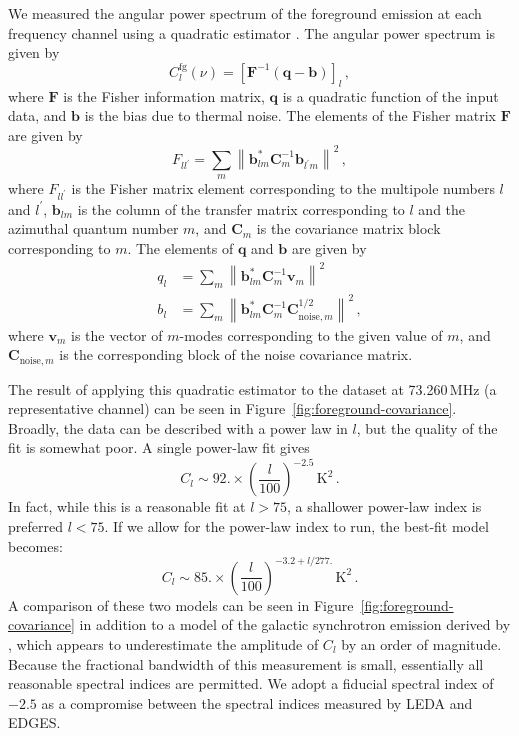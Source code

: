 \documentclass[twocolumn]{aastex62}
\newcommand{\todo}[1]{\PackageWarning{TODO:}{#1!}}
\renewcommand{\b}{\pmb}
\begin{document}
We measured the angular power spectrum of the foreground emission at each frequency channel using a
quadratic estimator \citep{1997PhRvD..55.5895T}. The angular power spectrum is given by
\begin{equation}
    C_l^\text{fg}(\nu) = \left[\b F^{-1} (\b q - \b b)\right]_l\,,
\end{equation}
where $\b F$ is the Fisher information matrix, $\b q$ is a quadratic function of the input data, and
$\b b$ is the bias due to thermal noise.  The elements of the Fisher matrix $\b F$ are given by
\begin{equation}
    F_{ll^\prime} = \sum_m \left\| \b b_{lm}^*\b C_m^{-1} \b b_{l^\prime m} \right\|^2\,,
\end{equation}
where $F_{ll^\prime}$ is the Fisher matrix element corresponding to the multipole numbers $l$ and
$l^\prime$, $\b b_{lm}$ is the column of the transfer matrix corresponding to $l$ and the azimuthal
quantum number $m$, and $\b C_m$ is the covariance matrix block corresponding to $m$. The elements
of $\b q$ and $\b b$ are given by
\begin{align}
    q_l &= \sum_m \left\| \b b_{lm}^*\b C_m^{-1} \b v_m \right\|^2 \\
    b_l &= \sum_m \left\| \b b_{lm}^*\b C_m^{-1} \b C^{1/2}_{\text{noise}, m} \right\|^2\,,
\end{align}
where $\b v_m$ is the vector of $m$-modes corresponding to the given value of $m$, and $\b
C_{\text{noise}, m}$ is the corresponding block of the noise covariance matrix.

The result of applying this quadratic estimator to the dataset at 73.260\,MHz (a representative
channel) can be seen in Figure~\ref{fig:foreground-covariance}. Broadly, the data can be described
with a power law in $l$, but the quality of the fit is somewhat poor. A single power-law fit gives
\begin{equation}
    C_l \sim 92. \times \left(\frac{l}{100}\right)^{-2.5} \,\text{K}^2\,.
\end{equation}
In fact, while this is a reasonable fit at $l > 75$, a shallower power-law index is preferred $l <
75$. If we allow for the power-law index to run, the best-fit model becomes:
\begin{equation}\label{eq:measured-cforeground}
    C_l \sim 85. \times \left(\frac{l}{100}\right)^{-3.2 + l/277.} \,\text{K}^2\,.
\end{equation}
A comparison of these two models can be seen in Figure~\ref{fig:foreground-covariance} in addition
to a model of the galactic synchrotron emission derived by \citet{2005ApJ...625..575S}, which
appears to underestimate the amplitude of $C_l$ by an order of magnitude.  Because the fractional
bandwidth of this measurement is small, essentially all reasonable spectral indices are permitted.
We adopt a fiducial spectral index of $-2.5$ as a compromise between the spectral indices measured
by LEDA and EDGES.
\todo{add uncertainties}
\end{document}
